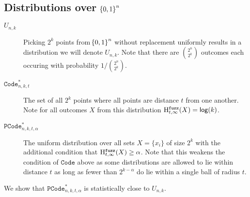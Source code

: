 \subsection{Distributions over $\!\left\{ 0,1 \right\}^{n}$}
\begin{description}
    \item[$U_{n,k}$] Picking $2^k$ points from $\!\left\{ 0,1 \right\}^{n}$ without replacement uniformly results in a distribution we will denote $U_{n,k}$. Note that there are ${2^{n}\choose 2^k}$ outcomes each occuring with probability $1/{2^{n}\choose 2^k}$.

    \item[$\mathtt{Code}_{n,k,t}^{*}$] The set of all $2^k$ points where all points are distance $t$ from one another.  Note for all outcomes $X$ from this distribution $\mathrm{H}^{\mathtt{fuzz}}_{t,\infty}(X) = \mathsf{log}\!\left(k\right)$.
    
    \item[$\mathtt{PCode}_{n, k, t, \alpha}^{*}$] The uniform distribution over all sets $X = \{x_i\}$ of size $2^k$ with the additional condition that $\mathrm{H}^{\mathtt{fuzz}}_{t,\infty}(X) \ge \alpha$.  Note that this weakens the condition of $\mathtt{Code}$ above as some distributions are allowed to lie within distance $t$ as long as fewer than $2^{k-\alpha}$ do lie within a single ball of radius $t$.
\end{description}
 
 \noindent
We show that $\mathtt{PCode}_{n, k, t, \alpha}^{*}$ is statistically close to $U_{n,k}$.

